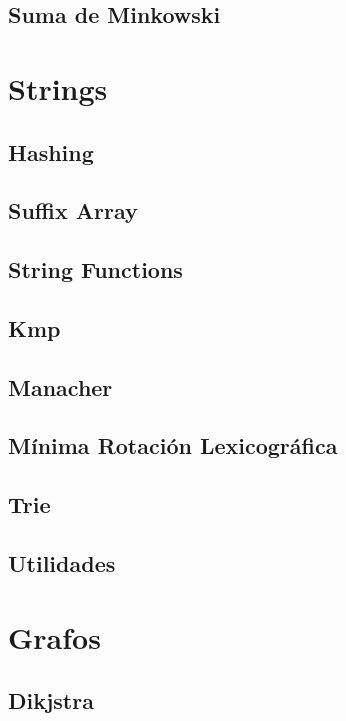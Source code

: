 \documentclass[a4paper,11pt,landscape,twocolumn]{article}
\begin{document}
\subsection{Suma de Minkowski}


\section{Strings} %
\subsection{Hashing}

\subsection{Suffix Array}

\subsection{String Functions}

\subsection{Kmp}

\subsection{Manacher}

\subsection{Mínima Rotación Lexicográfica}

\subsection{Trie}

\subsection{Utilidades}


\section{Grafos} %
\subsection{Dikjstra}

\end{document}
